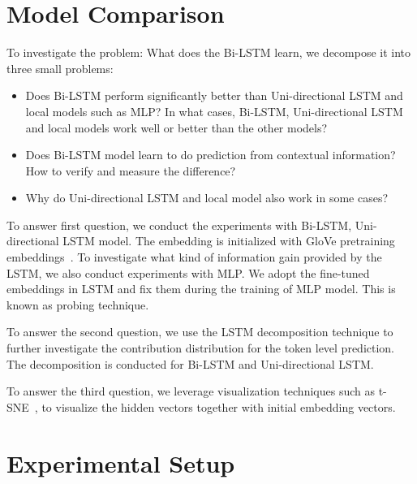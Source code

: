 \documentclass{article}
\begin{document}
\section{Model Comparison}

To investigate the problem: What does the Bi-LSTM learn, we decompose it into three small problems:

\begin{itemize}
	\item Does Bi-LSTM perform significantly better than Uni-directional LSTM and local models such as MLP? 
	In what cases, Bi-LSTM, Uni-directional LSTM and local models work well or better than the other models?
	\item Does Bi-LSTM model learn to do prediction from contextual information? How to verify and measure the difference?
	\item Why do Uni-directional LSTM and local model also work in some cases? 
\end{itemize}

To answer first question, we conduct the experiments with Bi-LSTM, Uni-directional LSTM model. The embedding is initialized with GloVe pretraining embeddings~\cite{pennington2014glove}. To investigate what kind of information gain provided by the LSTM, we also conduct experiments with MLP. We adopt the fine-tuned embeddings in LSTM and fix them during the training of MLP model. This is known as probing technique. 

To answer the second question, we use the LSTM decomposition technique to further investigate the contribution distribution for the token level prediction. The decomposition is conducted for Bi-LSTM and Uni-directional LSTM. 

To answer the third question, we leverage visualization techniques such as t-SNE~\cite{maaten2008visualizing}, to visualize the hidden vectors together with initial embedding vectors.


\section{Experimental Setup}

\end{document}
